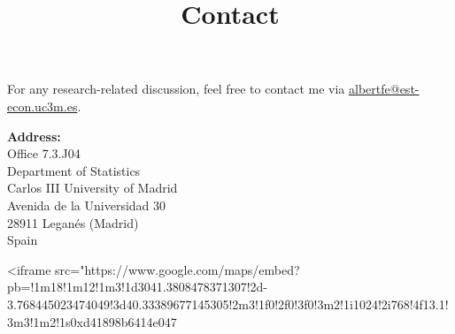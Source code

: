 \title{Contact}

For any research-related discussion, feel free to contact me via \href{mailto:albertfe@est-econ.uc3m.es}{albertfe@est-econ.uc3m.es}.

\textbf{Address:}\\
Office 7.3.J04\\
Department of Statistics\\
Carlos III University of Madrid\\
Avenida de la Universidad 30\\
28911 Leganés (Madrid)\\
Spain

\begin{html}
<iframe src="https://www.google.com/maps/embed?pb=!1m18!1m12!1m3!1d3041.3808478371307!2d-3.768445023474049!3d40.33389677145305!2m3!1f0!2f0!3f0!3m2!1i1024!2i768!4f13.1!3m3!1m2!1s0xd41898b6414e047%
\end{html}
